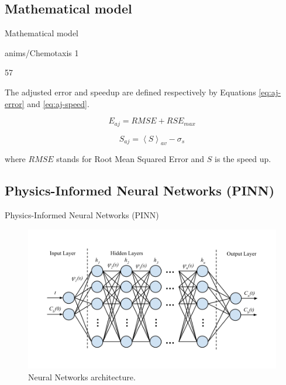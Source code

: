 \documentclass[serif,8pt, aspectratio=169]{beamer}
\begin{document}
\subsection{Mathematical model}
    \begin{frame}[fragile]{Mathematical model}
        \begin{minipage}{0.55\linewidth}
            \centering %
            {anims/Chemotaxis}%
            {1}%
            {57

}%
        \end{minipage}
        \begin{minipage}{0.4\linewidth}
            The adjusted error and speedup are defined respectively by Equations \ref{eq:aj-error} and \ref{eq:aj-speed}.
    
            \begin{equation}\label{eq:aj-error}
                E_{aj} = RMSE + RSE_{max}
            \end{equation}
    
            \begin{equation}\label{eq:aj-speed}
                S_{aj} = \left< S \right>_{av} - \sigma_s
            \end{equation}
    
            where $RMSE$ stands for Root Mean Squared Error and $S$ is the speed up.
        \end{minipage}
    \end{frame}

\subsection{Physics-Informed Neural Networks (PINN)}
 
\begin{frame}[fragile]{Physics-Informed Neural Networks (PINN)}
    \begin{figure}
        \centering
        \includegraphics[width=0.8\linewidth]{pic/Imune_pinn_model.png}
        \caption{Neural Networks architecture.}
        \label{fig:pinn-selection}
    \end{figure}
\end{frame}
\end{document}
